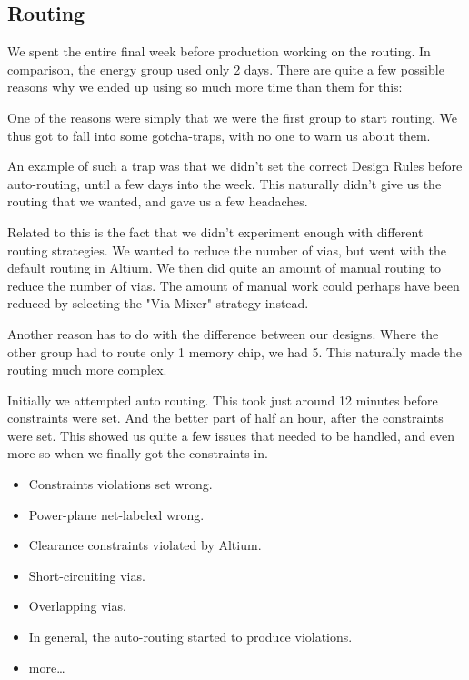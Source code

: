 \subsection {Routing}

We spent the entire final week before production working on the routing. In comparison, the energy group used only 2 days. There are quite a few possible reasons why we ended up using so much more time than them for this:

One of the reasons were simply that we were the first group to start routing. We thus got to fall into some gotcha-traps, with no one to warn us about them.

An example of such a trap was that we didn't set the correct Design Rules before auto-routing, until a few days into the week. This naturally didn't give us the routing that we wanted, and gave us a few headaches.

Related to this is the fact that we didn't experiment enough with different routing strategies. We wanted to reduce the number of vias, but went with the default routing in Altium. We then did quite an amount of manual routing to reduce the number of vias. The amount of manual work could perhaps have been reduced by selecting the "Via Mixer" strategy instead.


Another reason has to do with the difference between our designs. Where the other group had to route only 1 memory chip, we had 5. This naturally made the routing much more complex.

Initially we attempted auto routing. This took just around 12 minutes before constraints were set. And the better part of half an hour, after the constraints were set. This showed us quite a few issues that needed to be handled, and even more so when we finally got the constraints in.

\begin{itemize}
\item Constraints violations set wrong.
\item Power-plane net-labeled wrong.
\item Clearance constraints violated by Altium.
\item Short-circuiting vias.
\item Overlapping vias.
\item In general, the auto-routing started to produce violations.
\item more\ldots
\end{itemize}

